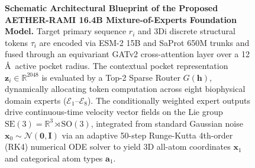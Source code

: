 \begin{figure}[t]
\begin{tikzpicture}
\end{tikzpicture}
\caption{\textbf{Schematic Architectural Blueprint of the Proposed AETHER-RAMI 16.4B Mixture-of-Experts Foundation Model.} Target primary sequence $r_i$ and 3Di discrete structural tokens $\tau_i$ are encoded via ESM-2 15B and SaProt 650M trunks and fused through an equivariant GATv2 cross-attention layer over a 12\,\AA\ active pocket radius. The contextual pocket representation $\mathbf{z}_i \in \mathbb{R}^{2048}$ is evaluated by a Top-2 Sparse Router $G(\mathbf{h})$, dynamically allocating token computation across eight biophysical domain experts ($\mathcal{E}_1$--$\mathcal{E}_8$). The conditionally weighted expert outputs drive continuous-time velocity vector fields on the Lie group $\mathrm{SE}(3) = \mathbb{R}^3 \rtimes \mathrm{SO}(3)$, integrated from standard Gaussian noise $\mathbf{x}_0 \sim \mathcal{N}(\mathbf{0}, \mathbf{I})$ via an adaptive 50-step Runge-Kutta 4th-order (RK4) numerical ODE solver to yield 3D all-atom coordinates $\mathbf{x}_1$ and categorical atom types $\mathbf{a}_1$.}
\label{fig:proposed_architecture_tikz}
\end{figure}


